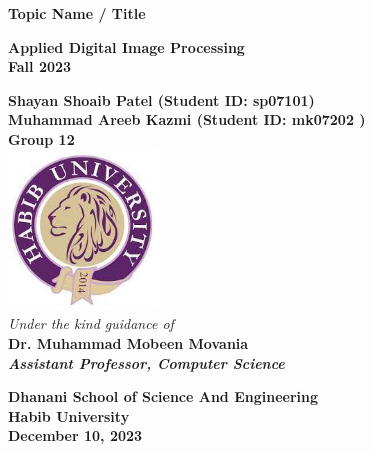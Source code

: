 \documentclass[12pt,a4paper,IEEEtran]{article}
\begin{document}
	\begin{center}
		\begin{LARGE}			\bf{Topic Name / Title\\}
		\end{LARGE}
		\vspace*{30pt}
		\textbf{Applied Digital Image Processing \\ Fall 2023}
		\vspace{40pt}
		
		\textbf{
			Shayan Shoaib Patel (Student ID: sp07101)\\
			Muhammad Areeb Kazmi (Student ID: mk07202 )\\
            Group 12}\\

		\vspace{30pt}
		\includegraphics[width=0.3\textwidth]{./logo.png} \\
		\vspace{30pt}
		\textit{Under the kind guidance of}\\
		\textbf{Dr. Muhammad Mobeen Movania}\\
		\textit{\textbf{Assistant Professor, Computer Science}}
		
		
		\vspace{20pt}
		
		
		\textbf{Dhanani School of Science And Engineering\\
			Habib University\\
			December 10, 2023
		}
	\end{center}





\setlength{\oddsidemargin}{0.25in}
\setlength{\textwidth}{6.5in}
\setlength{\topmargin}{0in}
\setlength{\textheight}{8.5in}
\end{document}
